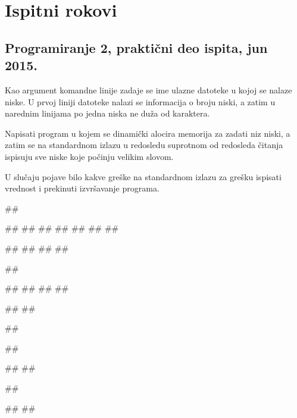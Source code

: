 \chapter{Ispitni rokovi}

\section{Programiranje 2, praktični deo ispita, jun 2015.}

\begin{Exercise}[label=901]
Kao argument komandne linije zadaje se ime ulazne datoteke u kojoj se nalaze niske. U prvoj liniji datoteke nalazi se informacija o broju niski, a zatim u narednim linijama po jedna niska ne duža od  karaktera.
  
Napisati program u kojem se dinamički alocira memorija za zadati niz niski, a zatim se na standardnom izlazu u redosledu suprotnom od redosleda čitanja ispisuju sve niske koje počinju velikim slovom. 

U slučaju pojave bilo kakve greške na standardnom izlazu za grešku ispisati vrednost  i prekinuti izvršavanje programa.

\begin{miditest}
\begin{test}{1}
##

##
##
##
##
##
##
##
  
#\naslovIzlaz#
##
##
##
\end{test}
\end{miditest}
\begin{minitest}
\begin{test}{2}
##

##
##
##
##

#\naslovIzlaz#
#\izlaz{}#
\end{test}
\end{minitest}


\begin{miditest}
\begin{test}{3}
##

##

#\naslovIzlaz#
##
\end{test}
\end{miditest}
\begin{miditest}
\begin{test}{4}
##

#\naslovIzlaz#
##
\end{test}
\end{miditest}

\end{Exercise}
\begin{Answer}[ref=901]
\end{Answer}


